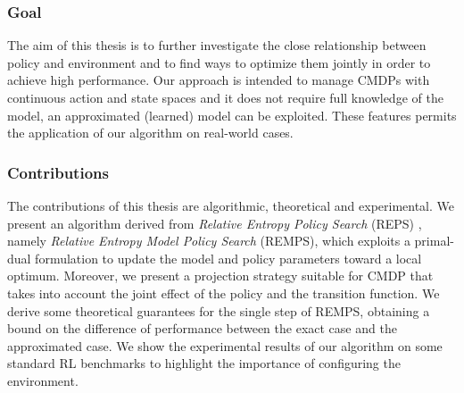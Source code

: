 \subsubsection{Goal}
The aim of this thesis is to further investigate the close relationship between policy and environment and to find ways to optimize them jointly in order to achieve high performance.
Our approach is intended to manage CMDPs with continuous action and state spaces and it does not require full knowledge of the model, an approximated (learned) model can be exploited. These features permits the application of our algorithm on real-world cases.
\subsubsection{Contributions}
The contributions of this thesis are algorithmic, theoretical and experimental. We present an algorithm derived from \textit{Relative Entropy Policy Search} (REPS) \citep{reps}, namely \textit{Relative Entropy Model Policy Search} (REMPS), which exploits a primal-dual formulation to update the model and policy parameters toward a local optimum. Moreover, we present a projection strategy suitable for CMDP that takes into account the joint effect of the policy and the transition function. \newline
We derive some theoretical guarantees for the single step of REMPS, obtaining a bound on the difference of performance between the exact case and the approximated case.  \newline
We show the experimental results of our algorithm on some standard RL benchmarks to highlight the importance of configuring the environment.
